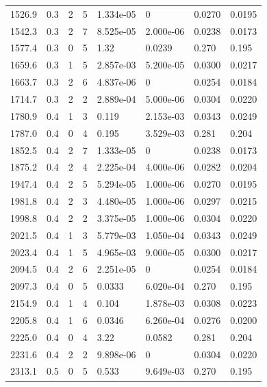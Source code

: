 \documentclass[preview]{standalone}
\begin{document}
{{{\begin{tabular}{L{1.2cm}C{1.2cm} C{0.3cm}C{0.5cm} C{1.4cm}C{1.4cm} C{1.4cm}C{1.4cm}}
  1526.9  &   0.3  & 2     &  5 &  1.334e-05  & 0  & 0.0270 &  0.0195   \\ 
  1542.3  &   0.3  & 2     &  7 &  8.525e-05  & 2.000e-06  & 0.0238 &  0.0173   \\ 
  1577.4  &   0.3  & 0     &  5 &  1.32  & 0.0239  & 0.270 &  0.195   \\ 
  1659.6  &   0.3  & 1     &  5 &  2.857e-03  & 5.200e-05  & 0.0300 &  0.0217   \\ 
  1663.7  &   0.3  & 2     &  6 &  4.837e-06  & 0  & 0.0254 &  0.0184   \\ 
  1714.7  &   0.3  & 2     &  2 &  2.889e-04  & 5.000e-06  & 0.0304 &  0.0220   \\ 
  1780.9  &   0.4  & 1     &  3 &  0.119  & 2.153e-03  & 0.0343 &  0.0249   \\ 
  1787.0  &   0.4  & 0     &  4 &  0.195  & 3.529e-03  & 0.281 &  0.204   \\ 
  1852.5  &   0.4  & 2     &  7 &  1.333e-05  & 0  & 0.0238 &  0.0173   \\ 
  1875.2  &   0.4  & 2     &  4 &  2.225e-04  & 4.000e-06  & 0.0282 &  0.0204   \\ 
  1947.4  &   0.4  & 2     &  5 &  5.294e-05  & 1.000e-06  & 0.0270 &  0.0195   \\ 
  1981.8  &   0.4  & 2     &  3 &  4.480e-05  & 1.000e-06  & 0.0297 &  0.0215   \\ 
  1998.8  &   0.4  & 2     &  2 &  3.375e-05  & 1.000e-06  & 0.0304 &  0.0220   \\ 
  2021.5  &   0.4  & 1     &  3 &  5.779e-03  & 1.050e-04  & 0.0343 &  0.0249   \\ 
  2023.4  &   0.4  & 1     &  5 &  4.965e-03  & 9.000e-05  & 0.0300 &  0.0217   \\ 
  2094.5  &   0.4  & 2     &  6 &  2.251e-05  & 0  & 0.0254 &  0.0184   \\ 
  2097.3  &   0.4  & 0     &  5 &  0.0333  & 6.020e-04  & 0.270 &  0.195   \\ 
  2154.9  &   0.4  & 1     &  4 &  0.104  & 1.878e-03  & 0.0308 &  0.0223   \\ 
  2205.8  &   0.4  & 1     &  6 &  0.0346  & 6.260e-04  & 0.0276 &  0.0200   \\ 
  2225.0  &   0.4  & 0     &  4 &  3.22  & 0.0582  & 0.281 &  0.204   \\ 
  2231.6  &   0.4  & 2     &  2 &  9.898e-06  & 0  & 0.0304 &  0.0220   \\ 
  2313.1  &   0.5  & 0     &  5 &  0.533  & 9.649e-03  & 0.270 &  0.195   \\ 

\end{tabular}}}}
\end{document}
